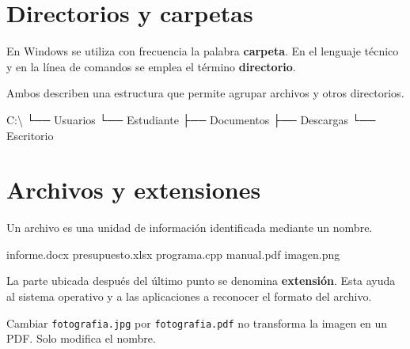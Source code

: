 \documentclass[
  spanish,
  letterpaper,
]{scrbook}
\newenvironment{Shaded}{\begin{snugshade}}{\end{snugshade}}
\newcommand{\NormalTok}[1]{\textcolor[rgb]{0.00,0.23,0.31}{#1}}
\begin{document}
\section{Directorios y carpetas}\label{directorios-y-carpetas}

En Windows se utiliza con frecuencia la palabra \textbf{carpeta}. En el
lenguaje técnico y en la línea de comandos se emplea el término
\textbf{directorio}.

Ambos describen una estructura que permite agrupar archivos y otros
directorios.

\begin{Shaded}
\begin{Highlighting}[]
\NormalTok{C:\textbackslash{}}
\NormalTok{└── Usuarios}
\NormalTok{    └── Estudiante}
\NormalTok{        ├── Documentos}
\NormalTok{        ├── Descargas}
\NormalTok{        └── Escritorio}
\end{Highlighting}
\end{Shaded}

\section{Archivos y extensiones}\label{archivos-y-extensiones}

Un archivo es una unidad de información identificada mediante un nombre.

\begin{Shaded}
\begin{Highlighting}[]
\NormalTok{informe.docx}
\NormalTok{presupuesto.xlsx}
\NormalTok{programa.cpp}
\NormalTok{manual.pdf}
\NormalTok{imagen.png}
\end{Highlighting}
\end{Shaded}

La parte ubicada después del último punto se denomina
\textbf{extensión}. Esta ayuda al sistema operativo y a las aplicaciones
a reconocer el formato del archivo.

\begin{tcolorbox}[enhanced jigsaw, arc=.35mm, bottomrule=.15mm, bottomtitle=1mm, breakable, colback=white, colbacktitle=quarto-callout-important-color!10!white, colframe=quarto-callout-important-color-frame, coltitle=black, left=2mm, leftrule=.75mm, opacityback=0, opacitybacktitle=0.6, rightrule=.15mm, title=\textcolor{quarto-callout-important-color}{\faExclamation}\hspace{0.5em}{Idea clave}, titlerule=0mm, toprule=.15mm, toptitle=1mm]

Cambiar \texttt{fotografia.jpg} por \texttt{fotografia.pdf} no
transforma la imagen en un PDF. Solo modifica el nombre.

\end{tcolorbox}
\end{document}
